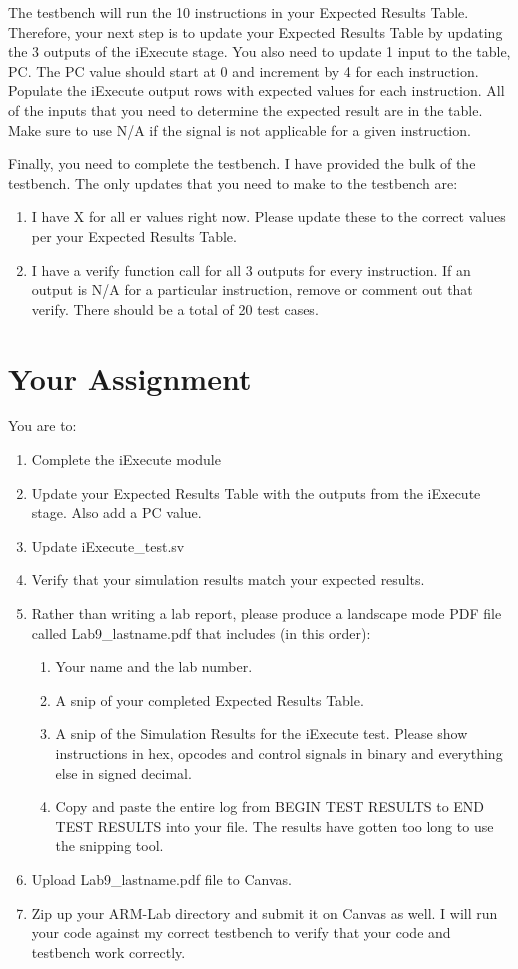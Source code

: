 The testbench will run the 10 instructions in your Expected Results Table.  Therefore, your next step is to update your Expected Results Table by updating the 3 outputs of the iExecute stage. You also need to update 1 input to the table, PC.  The PC value should start at 0 and increment by 4 for each instruction.  Populate the iExecute output rows with expected values for each instruction.  All of the inputs that you need to determine the expected result are in the table.  Make sure to use N/A if the signal is not applicable for a given instruction.

Finally, you need to complete the testbench.  I have provided the bulk of the testbench.  The only updates that you need to make to the testbench are:
\begin{enumerate}
	\item I have X for all er values right now.  Please update these to the correct values per your Expected Results Table.
	\item I have a verify function call for all 3 outputs for every instruction.  If an output is N/A for a particular instruction, remove or comment out that verify.  There should be a total of 20 test cases.  
\end{enumerate}   


\section{Your Assignment}
You are to:
\begin{enumerate}
\item Complete the iExecute module 
\item Update your Expected Results Table with the outputs from the iExecute stage.  Also add a PC value. 
\item Update iExecute\_test.sv
\item Verify that your simulation results match your expected results.
\item Rather than writing a lab report, please produce a landscape mode PDF file called Lab9\_lastname.pdf that includes (in this order):
\begin{enumerate}
	\item Your name and the lab number.
	\item A snip of your completed Expected Results Table.
	\item A snip of the Simulation Results for the iExecute test.  Please show instructions in hex, opcodes and control signals in binary and everything else in signed decimal.  
	\item Copy and paste the entire log from BEGIN TEST RESULTS to END TEST RESULTS into your file.  The results have gotten too long to use the snipping tool.	
\end{enumerate}
\item Upload Lab9\_lastname.pdf file to Canvas.
\item Zip up your ARM-Lab directory and submit it on Canvas as well.  I will run your code against my correct testbench to verify that your code and testbench work correctly.

\end{enumerate} 